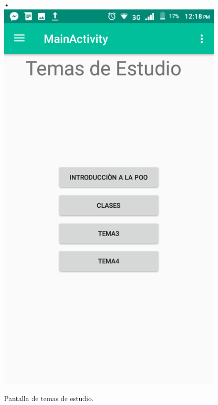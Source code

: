 \begin{center}
\begin{figure}[H]
•\includegraphics[scale=0.3]{img/4.png} 
\caption{Pantalla de temas de estudio.}
\end{figure}
\end{center}

